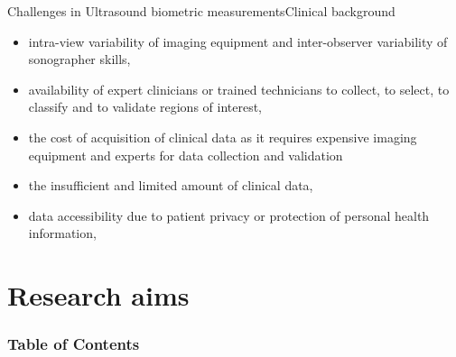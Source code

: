 {
\begin{frame}{Challenges in Ultrasound biometric measurements}{Clinical background}

\begin{itemize}
\item intra-view variability of imaging equipment and inter-observer variability of sonographer skills,
\item availability of expert clinicians or trained technicians to collect, to select, to classify and to validate regions of interest,
\item the cost of acquisition of clinical data as it requires expensive imaging equipment and experts for data collection and validation
\item the insufficient and limited amount of clinical data,
\item data accessibility due to patient privacy or protection of personal health information,
\end{itemize}

\end{frame}
}



\section{Research aims}
\begin{frame}
  \frametitle{Table of Contents}
  \tableofcontents[currentsection]
\end{frame}




